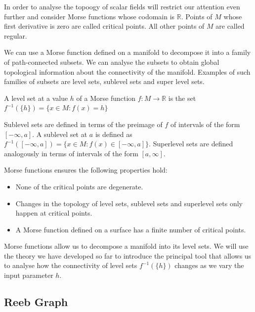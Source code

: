 In order to analyse the topoogy of scalar fields will restrict our attention even further and consider Morse functions whose codomain is $\mathbb{R}$. Points of $M$ whose first derivative is zero are called critical points. All other points of $M$ are called regular.

We can use a Morse function defined on a manifold to decompose it into a family of path-connected subsets. We can analyse the subsets to obtain global topological information about the connectivity of the manifold. Examples of such families of subsets are level sets, sublevel sets and super level sets.

\begin{defn} A level set at a value $h$ of a Morse function $f: M \to \mathbb{R}$ is the set $f^{-1}(\{h\}) = \{x \in M: f(x) = h \}$   \end{defn}

Sublevel sets are defined in terms of the preimage of $f$ of intervals of the form $[-\infty, a]$. A sublevel set at $a$ is defined as $f^{-1}([-\infty, a]) = \{x \in M: f(x) \in [-\infty, a] \}$. Superlevel sets are defined analogously in terms of intervals of the form $[a, \infty]$.


Morse functions ensures the following properties hold:

\begin{itemize}
    \item None of the critical points are degenerate.
    \item Changes in the topology of level sets, sublevel sets and superlevel sets only happen at critical points.
    \item A Morse function defined on a surface has a finite number of critical points.
\end{itemize}

Morse functions allow us to decompose a manifold into its level sets. We will use the theory we have developed so far to introduce the principal tool that allows us to analyse how the connectivity of level sets $f^{-1}(\{h\})$ changes as we vary the input parameter $h$.

\subsection{Reeb Graph}

